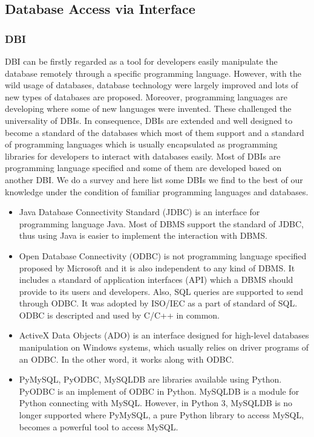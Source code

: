 \documentclass[onecolumn, conference, 12pt]{IEEEtran}
\begin{document}
	
	
	\subsection{Database Access via Interface}
	\subsubsection{DBI}
	DBI can be firstly regarded as a tool for developers easily manipulate the database remotely through a specific programming language. However, with the wild usage of databases, database technology were largely improved and lots of new types of databases are proposed. Moreover, programming languages are developing where some of new languages were invented. These challenged the universality of DBIs. In consequence, DBIs are extended and well designed to become a standard of the databases which most of them support and a standard of programming languages which is usually encapsulated as programming libraries for developers to interact with databases easily. Most of DBIs are programming language specified and some of them are developed based on another DBI. We do a survey and here list some DBIs we find to the best of our knowledge under the condition of familiar programming languages and databases. 
	\begin{itemize}[]
		\item Java Database Connectivity Standard (JDBC) is an interface for programming language Java. Most of DBMS support the standard of JDBC, thus using Java is easier to implement the interaction with DBMS.
		\item Open Database Connectivity (ODBC) is not programming language specified proposed by Microsoft and it is also independent to any kind of DBMS. It includes a standard of application interfaces (API) which a DBMS should provide to its users and developers. Also, SQL queries are supported to send through ODBC. It was adopted by ISO/IEC as a part of standard of SQL. ODBC is descripted and used by C/C++ in common.
		\item ActiveX Data Objects (ADO) is an interface designed for high-level databases manipulation on Windows systems, which usually relies on driver programs of an ODBC. In the other word, it works along with ODBC.
		\item PyMySQL, PyODBC, MySQLDB are libraries available using Python. PyODBC is an implement of ODBC in Python. MySQLDB is a module for Python connecting with MySQL. However, in Python 3, MySQLDB is no longer supported where PyMySQL, a pure Python library to access MySQL, becomes a powerful tool to access MySQL.
	\end{itemize}
\end{document}
